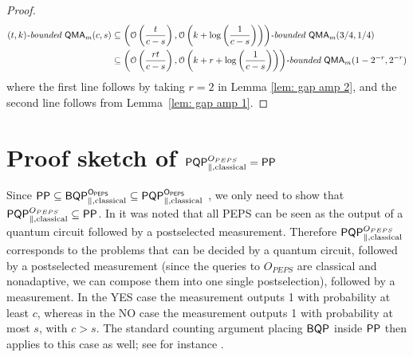 \documentclass[a4paper,UKenglish]{lipics-v2016}
\newcommand\QMA{{\sf{QMA}}}
\newcommand\PP{\sf{PP}}
\newcommand\BQP{{\sf{BQP}}}
\newcommand\PQP{{\sf{PQP}}}
\newcommand\bddQMA[5]{{\left(#1,#2\right)}\textit{-bounded }\QMA_{#3}(#4,#5)}
\begin{document}
\begin{proof}
\begin{align}
\bddQMA{t}{k}{m}{c}{s} &\subseteq \bddQMA{\mathcal{O}\left(\frac{t}{c-s}\right)}{\mathcal{O}\left(k+\log\left(\frac{1}{c-s}\right)\right)}{m}{3/4}{1/4}  \nonumber \\
&\subseteq \bddQMA{\mathcal{O}\left(\frac{rt}{c-s}\right)}{\mathcal{O}\left(k+r+\log\left(\frac{1}{c-s}\right)\right)}{m}{1-2^{-r}}{2^{-r}} \nonumber
\end{align}
where the first line follows by taking $r=2$ in Lemma \ref{lem: gap amp 2}, and the second line follows from Lemma~\ref{lem: gap amp 1}.
\end{proof}

\section{Proof sketch of $\PQP^{O_{PEPS}}_{\parallel,\text{classical}} = \PP$} \label{app:peps}
Since $\PP \subseteq \BQP^{O_{PEPS}}_{\parallel,\text{classical}} \subseteq \PQP^{O_{PEPS}}_{\parallel,\text{classical}}$ \cite{swv07}, we only need to show that $\PQP^{O_{PEPS}}_{\parallel,\text{classical}} \subseteq \PP$. In \cite{swv07} it was noted that all PEPS can be seen as the output of a quantum circuit followed by a postselected measurement. Therefore $\PQP^{O_{PEPS}}_{\parallel,\text{classical}}$ corresponds to the problems that can be decided by a quantum circuit, followed by a postselected measurement (since the queries to $O_{PEPS}$ are classical and nonadaptive, we can compose them into one single postselection), followed by a measurement. In the YES case the measurement outputs 1 with probability at least $c$, whereas in the NO case the measurement outputs 1 with probability at most $s$, with $c > s$. The standard counting argument placing $\BQP$ inside $\PP$ then applies to this case as well; see for instance \cite[Propositions~2~and~3]{aaronson05}.





\end{document}
